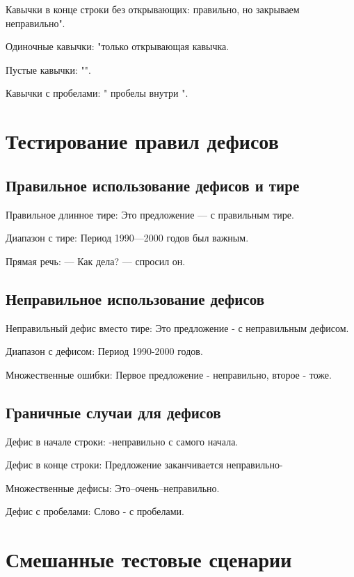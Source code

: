 \documentclass[12pt,a4paper]{article}
\begin{document}
Кавычки в конце строки без открывающих: правильно, но закрываем неправильно".

Одиночные кавычки: "только открывающая кавычка.

Пустые кавычки: "".

Кавычки с пробелами: " пробелы внутри ".

\section{Тестирование правил дефисов}

\subsection{Правильное использование дефисов и тире}

Правильное длинное тире: Это предложение — с правильным тире.

Диапазон с тире: Период 1990—2000 годов был важным.

Прямая речь: — Как дела? — спросил он.

\subsection{Неправильное использование дефисов}

Неправильный дефис вместо тире: Это предложение - с неправильным дефисом.

Диапазон с дефисом: Период 1990-2000 годов.

Множественные ошибки: Первое предложение - неправильно, второе - тоже.

\subsection{Граничные случаи для дефисов}

Дефис в начале строки: -неправильно с самого начала.

Дефис в конце строки: Предложение заканчивается неправильно-

Множественные дефисы: Это--очень--неправильно.

Дефис с пробелами: Слово - с пробелами.

\section{Смешанные тестовые сценарии}
\end{document}
